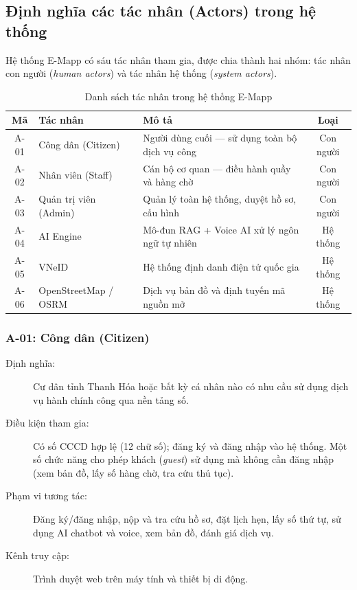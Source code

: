 \subsection{Định nghĩa các tác nhân (Actors) trong hệ thống}

Hệ thống E-Mapp có sáu tác nhân tham gia, được chia thành hai nhóm:
tác nhân con người (\textit{human actors}) và tác nhân hệ thống
(\textit{system actors}).

\begin{table}[H]
\centering
\caption{Danh sách tác nhân trong hệ thống E-Mapp}
\label{tab:actors}
\begin{tabularx}{\textwidth}{|c|l|X|c|}
\hline
\textbf{Mã} & \textbf{Tác nhân} & \textbf{Mô tả} & \textbf{Loại} \\
\hline
A-01 & Công dân (Citizen)     & Người dùng cuối — sử dụng toàn bộ dịch vụ công     & Con người \\
A-02 & Nhân viên (Staff)      & Cán bộ cơ quan — điều hành quầy và hàng chờ        & Con người \\
A-03 & Quản trị viên (Admin)  & Quản lý toàn hệ thống, duyệt hồ sơ, cấu hình      & Con người \\
A-04 & AI Engine              & Mô-đun RAG + Voice AI xử lý ngôn ngữ tự nhiên      & Hệ thống \\
A-05 & VNeID                  & Hệ thống định danh điện tử quốc gia                & Hệ thống \\
A-06 & OpenStreetMap / OSRM   & Dịch vụ bản đồ và định tuyến mã nguồn mở          & Hệ thống \\
\hline
\end{tabularx}
\end{table}

\subsubsection{A-01: Công dân (Citizen)}

\begin{description}
  \item[Định nghĩa:] Cư dân tỉnh Thanh Hóa hoặc bất kỳ cá nhân nào
    có nhu cầu sử dụng dịch vụ hành chính công qua nền tảng số.
  \item[Điều kiện tham gia:] Có số CCCD hợp lệ (12 chữ số); đăng ký
    và đăng nhập vào hệ thống. Một số chức năng cho phép khách
    (\textit{guest}) sử dụng mà không cần đăng nhập
    (xem bản đồ, lấy số hàng chờ, tra cứu thủ tục).
  \item[Phạm vi tương tác:] Đăng ký/đăng nhập, nộp và tra cứu hồ sơ,
    đặt lịch hẹn, lấy số thứ tự, sử dụng AI chatbot và voice,
    xem bản đồ, đánh giá dịch vụ.
  \item[Kênh truy cập:] Trình duyệt web trên máy tính và thiết bị di động.
\end{description}

